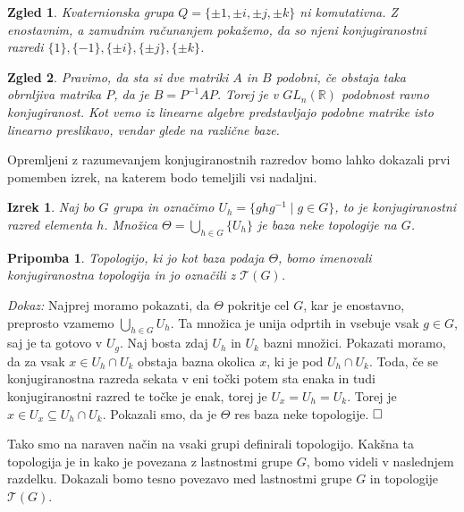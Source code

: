 \documentclass[a4paper,12pt]{article}
\def\R{\mathbb{R}} %
\def\qed{$\hfill\Box$}   %
\newtheorem{izrek}{Izrek}
\newtheorem{pripomba}{Pripomba}
\newtheorem{zgled}{Zgled}
\begin{document}
\begin{zgled}
    Kvaternionska grupa $Q = \{\pm 1, \pm i, \pm j, \pm k\}$ ni komutativna. Z enostavnim, a zamudnim računanjem pokažemo,
    da so njeni konjugiranostni razredi $\{1\}, \{-1\}, \{\pm i\}, \{\pm j\}, \{\pm k\}$. 
\end{zgled}

\begin{zgled}
    Pravimo, da sta si dve matriki $A$ in $B$ podobni, če obstaja taka obrnljiva matrika $P$, da je $B = P^{-1}AP$.
    Torej je v $GL_n(\R)$ podobnost ravno konjugiranost. Kot vemo iz linearne algebre predstavljajo podobne matrike isto linearno preslikavo,
    vendar glede na različne baze.
\end{zgled}

Opremljeni z razumevanjem konjugiranostnih razredov bomo lahko dokazali prvi pomemben izrek, na katerem bodo temeljili vsi nadaljni.

\begin{izrek}
    Naj bo $G$ grupa in označimo $U_h = \{ghg^{-1} \mid g \in G \}$, to je konjugiranostni razred elementa $h$.
    Množica $\Theta = \bigcup_{h \in G}\{U_h\}$ je baza neke topologije na $G$.
\end{izrek}

\begin{pripomba}
    Topologijo, ki jo kot baza podaja $\Theta$, bomo imenovali \emph{konjugiranostna topologija} in jo označili z $\mathcal{T}(G)$.
\end{pripomba}


\noindent
{\em Dokaz:\/}
    Najprej moramo pokazati, da $\Theta$ pokritje cel $G$, kar je enostavno, preprosto vzamemo $\bigcup_{h \in G}U_h$.
    Ta množica je unija odprtih in vsebuje vsak $g \in G$, saj je ta gotovo v $U_g$.
    Naj bosta zdaj  $U_h$ in $U_k$ bazni množici. Pokazati moramo, da za vsak $x \in U_h \cap U_k$ obstaja bazna okolica $x$, ki je pod $U_h \cap U_k$.
    Toda, če se konjugiranostna razreda sekata v eni točki potem sta enaka in tudi konjugiranostni razred te točke je enak, torej je $U_x = U_h = U_k$.
    Torej je $x \in U_x \subseteq U_h \cap U_k$. Pokazali smo, da je $\Theta$ res baza neke topologije.
\qed

Tako smo na naraven način na vsaki grupi definirali topologijo.
Kakšna ta topologija je in kako je povezana z lastnostmi grupe $G$, bomo videli v naslednjem razdelku.
Dokazali bomo tesno povezavo med lastnostmi grupe $G$ in topologije $\mathcal{T}(G)$.
\end{document}
